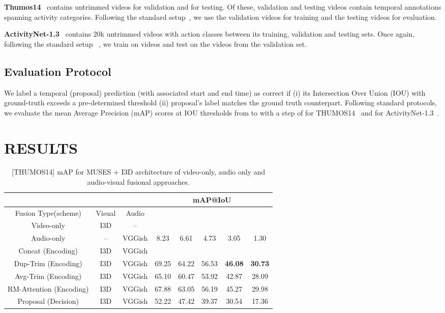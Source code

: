 \documentclass[10pt,twocolumn,letterpaper]{article}
\begin{document}
\textbf{Thumos14}~\cite{THUMOS14} contains  untrimmed videos for validation and  for testing. Of these,  validation and  testing videos contain temporal annotations spanning  activity categories. Following the standard setup~\cite{Xu_2020_CVPR,PGCN2019ICCV}, we use the  validation videos for training and the  testing videos for evaluation. 

\textbf{ActivityNet-1.3}~\cite{Heilbron_2015_CVPR} contains 20k untrimmed videos with  action classes between its training, validation and testing sets. Once again, following the standard setup~\cite{Xu_2020_CVPR,PGCN2019ICCV} , we train on  videos and test on the  videos from the validation set. 

\subsection{Evaluation Protocol}
\label{sec:evalprotocol}

We label a temporal (proposal) prediction (with associated start and end time) as correct if (i) its Intersection Over Union (IOU) with ground-truth exceeds a pre-determined threshold (ii) proposal's label matches the ground truth counterpart. Following standard protocols, we evaluate the mean Average Precision (mAP) scores at IOU thresholds from  to  with a step of  for THUMOS14~\cite{THUMOS14} and  for ActivityNet-1.3~\cite{Heilbron_2015_CVPR}.


\section{\uppercase{ Results}}
\label{sec:results}

\begin{table}[!t]
\centering
\resizebox{\linewidth}{!}
{
\centering
\begin{tabular}{c|c|c|c|c|c|c|c}
       & &  & \multicolumn{5}{c}{mAP@IoU} \\
\toprule
 Fusion Type(scheme) & Visual  & Audio &  &  &  &  &  \\
\toprule
 Video-only & I3D & -- &  &  &  &  &  \\ 
  \midrule
Audio-only & -- & VGGish & 8.23 & 6.61 & 4.73 & 3.05 & 1.30 \\
\toprule
 Concat (Encoding) & I3D & VGGish &  &  &  &  &   \\
 \midrule
 Dup-Trim (Encoding) & I3D & VGGish & 69.25 & 64.22 & 56.53 & \textbf{46.08} & \textbf{30.73} \\
  \midrule
 Avg-Trim (Encoding) & I3D & VGGish & 65.10 & 60.47 & 53.92 & 42.87 & 28.09 \\
  \midrule
 RM-Attention (Encoding) & I3D & VGGish & 67.88 & 63.05 & 56.19 & 45.27 & 29.98 \\
  \midrule
 Proposal (Decision) & I3D & VGGish & 52.22	& 47.42	& 39.37	& 30.54	& 17.36   \\

  
 \bottomrule
\end{tabular}
}
\caption{[THUMOS14] mAP for MUSES\cite{Liu_2021_CVPR} + I3D\cite{8099985} architecture of video-only, audio only and audio-visual fusional approaches.}
\label{tab:topav-thumos}
\end{table}
\end{document}

